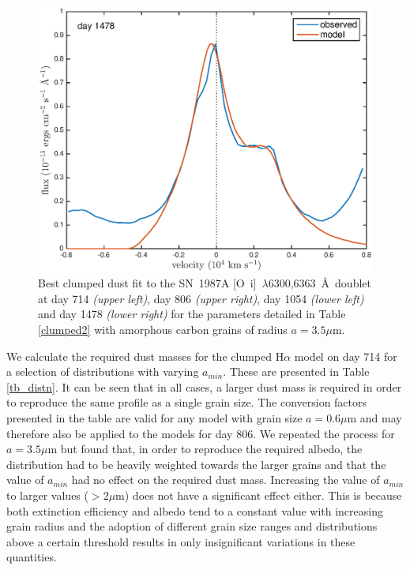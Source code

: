 \documentclass[useAMS,usenatbib,usegraphicx]{mnras}
\begin{document}
\begin{figure}
\begin{center}
\includegraphics[trim =33 10 45 15,clip=true,scale=0.47]{clump_1/maximum/d1478OI_new}
\caption{Best clumped dust fit to the SN~1987A [O~{\sc i}]~$\lambda$6300,6363~\AA\ doublet at day 714 \textit{(upper left)}, day 806 \textit{(upper right)}, day 1054 \textit{(lower left)} and day 1478 \textit{(lower right)} for the parameters detailed in Table \ref{clumped2} with amorphous carbon grains of radius $a=3.5 \mu$m.}
\label{OI_clump2}
\end{center}
\end{figure}

We calculate the required dust masses for the clumped H$\alpha$ model on day 714 for a selection of distributions with varying $a_{min}$.  These are presented in Table \ref{tb_distn}.  It can be seen that in all cases, a larger dust mass is required in order to reproduce the same profile as a single grain size.  The conversion factors presented in the table are valid for any model with grain size $a=0.6\mu$m and may therefore also be applied to the models for day 806.  We repeated the process for $a=3.5 \mu$m but found that, in order to reproduce the required albedo, the distribution had to be heavily weighted towards the larger grains and that the value of $a_{min}$ had no effect on the required dust mass.  Increasing the value of $a_{min}$ to larger values ($>2\mu$m) does not have a significant effect either.  This is because both extinction efficiency and albedo tend to a constant value with increasing grain radius and the adoption of different grain size ranges and distributions above a certain threshold results in only insignificant variations in these quantities. 
\end{document}
